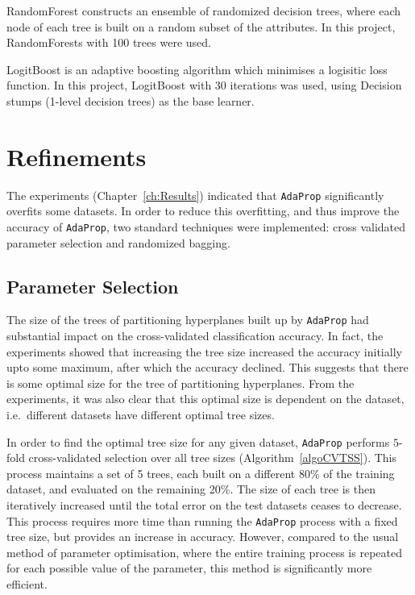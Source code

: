 \documentclass[a4paper,12pt]{report} %
\newcommand{\AdaProp}{\texttt{AdaProp}\xspace}
\begin{document}
RandomForest \cite{breiman} constructs an ensemble of 
    randomized decision trees, where each node of each tree is 
    built on a random subset of the attributes.
In this project, RandomForests with 100 trees were used.

LogitBoost \cite{friedman} is an adaptive boosting algorithm 
    which minimises a logisitic loss function.
In this project, LogitBoost with 30 iterations was used, 
    using Decision stumps (1-level decision trees) as the base learner.


\section{Refinements}

The experiments (Chapter~\ref{ch:Results}) indicated that \AdaProp 
    significantly overfits some datasets.
In order to reduce this overfitting, 
    and thus improve the accuracy of \AdaProp, 
    two standard techniques were implemented: 
    cross validated parameter selection
    and randomized bagging.


\subsection{Parameter Selection}

The size of the trees of partitioning hyperplanes 
    built up by \AdaProp had substantial impact on
    the cross-validated classification accuracy.
In fact, the experiments showed that increasing the tree
    size increased the accuracy initially upto some 
    maximum, after which the accuracy declined.
This suggests that there is some optimal size 
    for the tree of partitioning hyperplanes.
From the experiments, it was also clear that this
    optimal size is dependent on the dataset, 
    i.e.\ different datasets have different optimal tree sizes.
    
In order to find the optimal tree size for any given dataset, 
    \AdaProp performs $5$-fold cross-validated selection 
    over all tree sizes (Algorithm~\ref{algoCVTSS}).
This process maintains a set of 5 trees, each built on 
    a different 80\% of the training dataset, 
    and evaluated on the remaining 20\%.
The size of each tree is then iteratively increased
    until the total error on the test datasets ceases to decrease.
This process requires more time than running 
    the \AdaProp process with a fixed tree size, 
    but provides an increase in accuracy.
However, compared to the usual method of parameter optimisation, 
    where the entire training process is repeated for each possible 
    value of the parameter, this method is significantly more efficient.
\end{document}
